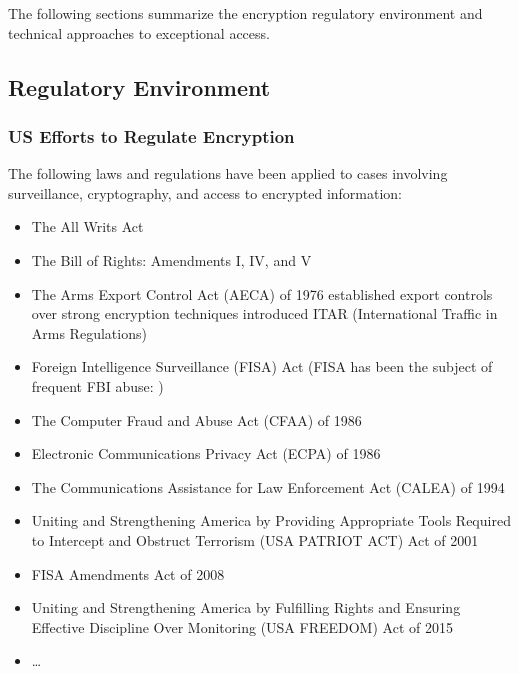 
The following sections summarize the encryption regulatory environment and technical approaches to exceptional access.

\subsection{Regulatory Environment}
\label{sec-reg-environment}

\subsubsection*{US Efforts to Regulate Encryption}

The following laws and regulations have been applied to cases involving surveillance, cryptography, and access to
encrypted information:

\begin{itemize}
    \item The All Writs Act \cite{congress_1789}
    \item The Bill of Rights: Amendments I, IV, and V \cite{madison_1791}
    \item The Arms Export Control Act (AECA) of 1976 established export controls over strong encryption techniques
        introduced ITAR (International Traffic in Arms Regulations) \cite{morgan_hr13680_1976} \cite{kehl_right_2015}
    \item Foreign Intelligence Surveillance (FISA) Act \cite{rodino_1978}
        (FISA has been the subject of frequent FBI abuse: \cite{shamsi_2011} \cite{tucker_2020})
    \item The Computer Fraud and Abuse Act (CFAA) of 1986 \cite{hughes_hr4718_1986} \cite{wolff_computer_2016}
    \item Electronic Communications Privacy Act (ECPA) of 1986 \cite{kastenmeier_hr4952_1986}
    \item The Communications Assistance for Law Enforcement Act (CALEA) of 1994 \cite{edwards_hr4922_1994}
    \item Uniting and Strengthening America by Providing Appropriate Tools Required to Intercept and Obstruct Terrorism
        (USA PATRIOT ACT) Act of 2001 \cite{sensenbrenner_2001}
    \item FISA Amendments Act of 2008 \cite{reyes_hr6304_2008}
    \item Uniting and Strengthening America by Fulfilling Rights and Ensuring Effective Discipline Over Monitoring
        (USA FREEDOM) Act of 2015 \cite{sensenbrenner_2015}
    \item \dots
\end{itemize}

